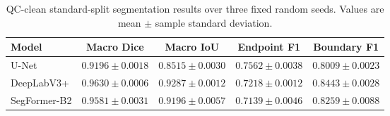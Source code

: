 \begin{table}[t]
\centering
\caption{QC-clean standard-split segmentation results over three fixed random
seeds. Values are mean \(\pm\) sample standard deviation.}
\label{tab:task1-main}
\small
\begin{tabular}{lcccc}
\toprule
Model & Macro Dice & Macro IoU & Endpoint F1 & Boundary F1 \\
\midrule
U-Net
  & \(0.9196 \pm 0.0018\)
  & \(0.8515 \pm 0.0030\)
  & \(\mathbf{0.7562 \pm 0.0038}\)
  & \(0.8009 \pm 0.0023\) \\
DeepLabV3+
  & \(\mathbf{0.9630 \pm 0.0006}\)
  & \(\mathbf{0.9287 \pm 0.0012}\)
  & \(0.7218 \pm 0.0012\)
  & \(\mathbf{0.8443 \pm 0.0028}\) \\
SegFormer-B2
  & \(0.9581 \pm 0.0031\)
  & \(0.9196 \pm 0.0057\)
  & \(0.7139 \pm 0.0046\)
  & \(0.8259 \pm 0.0088\) \\
\bottomrule
\end{tabular}
\end{table}

